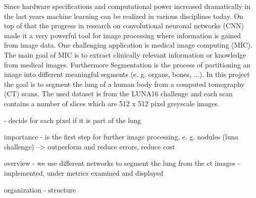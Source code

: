 
Since hardware specifications and computational power increased dramatically in the last years machine learning can be realized in various disciplines today. On top of that the progress in research on convolutional neuronal networks (CNN) made it a very powerful tool for image processing where information is gained from image data.\newline
One challenging application is medical image computing (MIC). The main goal of MIC is to extract clinically relevant information or knowledge from medical images. Furthermore Segmentation is the process of partitioning an image into different meaningful segments (e. g. organs, bones, ...).\newline
In this project the goal is to segment the lung of a human body from a computed tomography (CT) scans.\newline
The used dataset is from the LUNA16 challenge \cite{luna} and each scan contains a number of slices which are 512 x 512 pixel greyscale images.

- decide for each pixel if it is part of the lung

importance
- is the first step for further image processing, e. g. nodules (luna challenge)
 --> outperform and reduce errors, reduce cost
 
overview
- we use different networks to segment the lung from the ct images
- implemented, under metrics examined and displayed

organization
- structure
